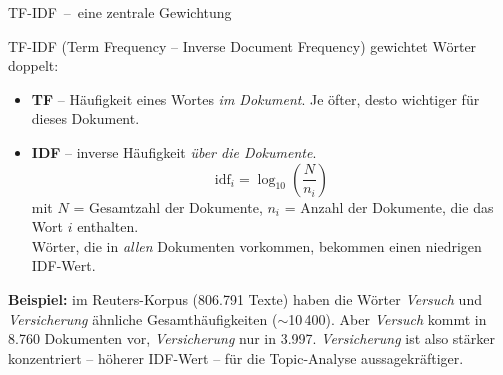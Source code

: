 \documentclass[aspectratio=169,11pt]{beamer}
\newcommand{\mdash}{\,{\monodash–}\,}
\let\oldemph\emph
\renewcommand{\emph}[1]{{\color{solCyan}\oldemph{#1}}}
\let\oldtextbf\textbf
\renewcommand{\textbf}[1]{{\color{solBase3}\oldtextbf{#1}}}
\begin{document}
\begin{frame}{TF-IDF \mdash{} eine zentrale Gewichtung}

  TF-IDF (Term Frequency – Inverse Document Frequency) gewichtet
  Wörter doppelt:

  \vfill
  \begin{itemize}
    \item \textbf{TF} – Häufigkeit eines Wortes \emph{im Dokument}.
          Je öfter, desto wichtiger für dieses Dokument.
    \vfill
    \item \textbf{IDF} – inverse Häufigkeit \emph{über die Dokumente}.
          \[ \mathrm{idf}_i = \log_{10}\!\left(\frac{N}{n_i}\right) \]
          mit $N$ = Gesamtzahl der Dokumente, $n_i$ = Anzahl der
          Dokumente, die das Wort $i$ enthalten.
          \\[2pt]
          Wörter, die in \emph{allen} Dokumenten vorkommen, bekommen
          einen niedrigen IDF-Wert.
  \end{itemize}

  \vfill
  \textbf{Beispiel:} im Reuters-Korpus (806.791 Texte) haben die
  Wörter \emph{Versuch} und \emph{Versicherung} ähnliche
  Gesamthäufigkeiten ($\sim$10\,400). Aber \emph{Versuch} kommt in
  8.760 Dokumenten vor, \emph{Versicherung} nur in 3.997.
  \emph{Versicherung} ist also stärker konzentriert – höherer
  IDF-Wert – für die Topic-Analyse aussagekräftiger.

\end{frame}
\end{document}
